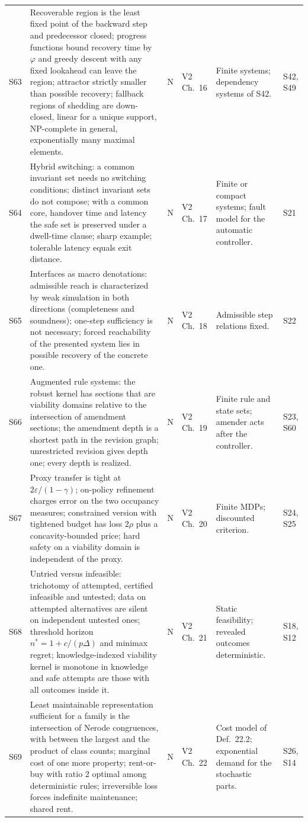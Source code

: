 \documentclass[10pt]{article}
\begin{document}
\begin{longtable}{@{}l p{} c l p{} p{}@{}}
S63 & Recoverable region is the least fixed point of the backward step and predecessor closed; progress functions bound recovery time by $\varphi$ and greedy descent with any fixed lookahead can leave the region; attractor strictly smaller than possible recovery; fallback regions of shedding are down-closed, linear for a unique support, NP-complete in general, exponentially many maximal elements. & N & V2 Ch.~16 & Finite systems; dependency systems of S42. & S42, S49\\[3pt]
S64 & Hybrid switching: a common invariant set needs no switching conditions; distinct invariant sets do not compose; with a common core, handover time and latency the safe set is preserved under a dwell-time clause; sharp example; tolerable latency equals exit distance. & N & V2 Ch.~17 & Finite or compact systems; fault model for the automatic controller. & S21\\[3pt]
S65 & Interfaces as macro denotations: admissible reach is characterized by weak simulation in both directions (completeness and soundness); one-step sufficiency is not necessary; forced reachability of the presented system lies in possible recovery of the concrete one. & N & V2 Ch.~18 & Admissible step relations fixed. & S22\\[3pt]
S66 & Augmented rule systems: the robust kernel has sections that are viability domains relative to the intersection of amendment sections; the amendment depth is a shortest path in the revision graph; unrestricted revision gives depth one; every depth is realized. & N & V2 Ch.~19 & Finite rule and state sets; amender acts after the controller. & S23, S60\\[3pt]
S67 & Proxy transfer is tight at $2\varepsilon/(1-\gamma)$; on-policy refinement charges error on the two occupancy measures; constrained version with tightened budget has loss $2\rho$ plus a concavity-bounded price; hard safety on a viability domain is independent of the proxy. & N & V2 Ch.~20 & Finite MDPs; discounted criterion. & S24, S25\\[3pt]
S68 & Untried versus infeasible: trichotomy of attempted, certified infeasible and untested; data on attempted alternatives are silent on independent untested ones; threshold horizon $n^*=1+c/(p\Delta)$ and minimax regret; knowledge-indexed viability kernel is monotone in knowledge and safe attempts are those with all outcomes inside it. & N & V2 Ch.~21 & Static feasibility; revealed outcomes deterministic. & S18, S12\\[3pt]
S69 & Least maintainable representation sufficient for a family is the intersection of Nerode congruences, with between the largest and the product of class counts; marginal cost of one more property; rent-or-buy with ratio 2 optimal among deterministic rules; irreversible loss forces indefinite maintenance; shared rent. & N & V2 Ch.~22 & Cost model of Def.~22.2; exponential demand for the stochastic parts. & S26, S14\\[3pt]

\end{longtable}
\end{document}
